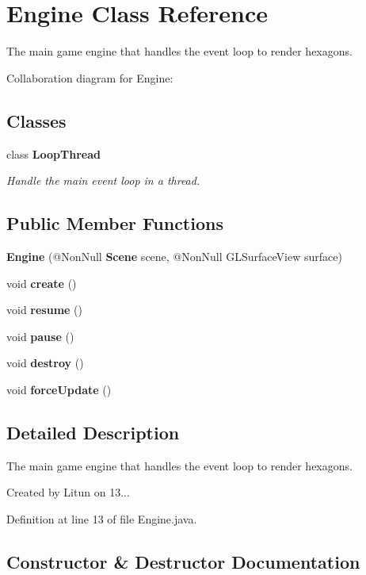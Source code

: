 \section{Engine Class Reference}
\label{classru_1_1litun_1_1unitingtwist_1_1_engine}


The main game engine that handles the event loop to render hexagons.  




Collaboration diagram for Engine\+:
\subsection*{Classes}
\begin{DoxyCompactItemize}
\item 
class {\bfseries Loop\+Thread}
\begin{DoxyCompactList}\small\item\em Handle the main event loop in a thread. \end{DoxyCompactList}\end{DoxyCompactItemize}
\subsection*{Public Member Functions}
\begin{DoxyCompactItemize}
\item 
\textbf{ Engine} (@Non\+Null \textbf{ Scene} scene, @Non\+Null G\+L\+Surface\+View surface)
\item 
void \textbf{ create} ()
\item 
void \textbf{ resume} ()
\item 
void \textbf{ pause} ()
\item 
void \textbf{ destroy} ()
\item 
void \textbf{ force\+Update} ()
\end{DoxyCompactItemize}


\subsection{Detailed Description}
The main game engine that handles the event loop to render hexagons. 

Created by Litun on 13... 

Definition at line 13 of file Engine.\+java.



\subsection{Constructor \& Destructor Documentation}
\mbox{\label{classru_1_1litun_1_1unitingtwist_1_1_engine_aeec39154ee36ea97df26b53276e8d905}} 
